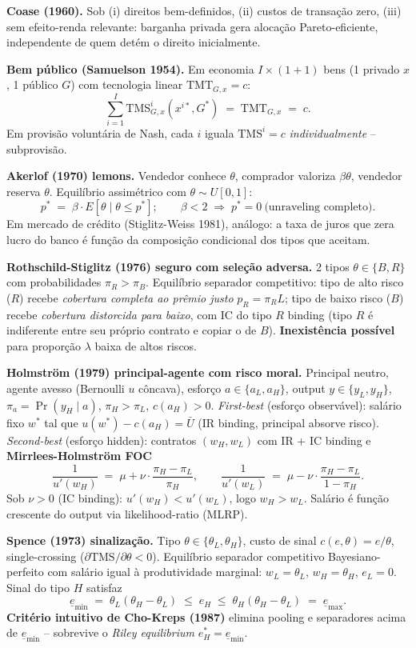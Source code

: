 \documentclass[11pt,addpoints]{exam}
\newcommand{\TMS}{\text{TMS}}
\newcommand{\TMT}{\text{TMT}}
\begin{document}
    \textbf{Coase (1960).} Sob (i) direitos bem-definidos, (ii) custos de transação zero, (iii) sem efeito-renda relevante: barganha privada gera alocação Pareto-eficiente, independente de quem detém o direito inicialmente.

    \textbf{Bem público (Samuelson 1954).} Em economia $I \times (1+1)$ bens (1 privado $x$, 1 público $G$) com tecnologia linear $\TMT_{G,x} = c$:
    \[
        \boxed{\;\sum_{i=1}^I \TMS^i_{G,x}(x^{i*}, G^*) \;=\; \TMT_{G,x} \;=\; c.\;}
    \]
    Em provisão voluntária de Nash, cada $i$ iguala $\TMS^i = c$ \emph{individualmente} -- subprovisão.

    \textbf{Akerlof (1970) lemons.} Vendedor conhece $\theta$, comprador valoriza $\beta\theta$, vendedor reserva $\theta$. Equilíbrio assimétrico com $\theta \sim U[0, 1]$:
    \[
        p^* \;=\; \beta \cdot E[\theta \mid \theta \leq p^*];\qquad \beta < 2 \;\Longrightarrow\; p^* = 0\ \text{(unraveling completo)}.
    \]
    Em mercado de crédito (Stiglitz-Weiss 1981), análogo: a taxa de juros que zera lucro do banco é função da composição condicional dos tipos que aceitam.

    \textbf{Rothschild-Stiglitz (1976) seguro com seleção adversa.} 2 tipos $\theta \in \{B, R\}$ com probabilidades $\pi_R > \pi_B$. Equilíbrio separador competitivo: tipo de alto risco ($R$) recebe \emph{cobertura completa ao prêmio justo} $p_R = \pi_R L$; tipo de baixo risco ($B$) recebe \emph{cobertura distorcida para baixo}, com IC do tipo $R$ binding (tipo $R$ é indiferente entre seu próprio contrato e copiar o de $B$). \textbf{Inexistência possível} para proporção $\lambda$ baixa de altos riscos.

    \textbf{Holmström (1979) principal-agente com risco moral.} Principal neutro, agente avesso (Bernoulli $u$ côncava), esforço $a \in \{a_L, a_H\}$, output $y \in \{y_L, y_H\}$, $\pi_a = \Pr(y_H \mid a)$, $\pi_H > \pi_L$, $c(a_H) > 0$.
    \emph{First-best} (esforço observável): salário fixo $w^*$ tal que $u(w^*) - c(a_H) = \bar U$ (IR binding, principal absorve risco).
    \emph{Second-best} (esforço hidden): contratos $(w_H, w_L)$ com IR + IC binding e \textbf{Mirrlees-Holmström FOC}
    \[
        \boxed{\;\frac{1}{u'(w_H)} \;=\; \mu + \nu\cdot\frac{\pi_H - \pi_L}{\pi_H},\qquad
        \frac{1}{u'(w_L)} \;=\; \mu - \nu\cdot\frac{\pi_H - \pi_L}{1-\pi_H}.\;}
    \]
    Sob $\nu > 0$ (IC binding): $u'(w_H) < u'(w_L)$, logo $w_H > w_L$. Salário é função crescente do output via likelihood-ratio (MLRP).

    \textbf{Spence (1973) sinalização.} Tipo $\theta \in \{\theta_L, \theta_H\}$, custo de sinal $c(e, \theta) = e/\theta$, single-crossing ($\partial \TMS/\partial \theta < 0$). Equilíbrio separador competitivo Bayesiano-perfeito com salário igual à produtividade marginal: $w_L = \theta_L$, $w_H = \theta_H$, $e_L = 0$. Sinal do tipo $H$ satisfaz
    \[
        \underline{e}_{\min} \;=\; \theta_L(\theta_H - \theta_L) \;\leq\; e_H \;\leq\; \theta_H(\theta_H - \theta_L) \;=\; \underline{e}_{\max}.
    \]
    \textbf{Critério intuitivo de Cho-Kreps (1987)} elimina pooling e separadores acima de $\underline{e}_{\min}$ -- sobrevive o \emph{Riley equilibrium} $e^*_H = \underline{e}_{\min}$.
\end{document}
